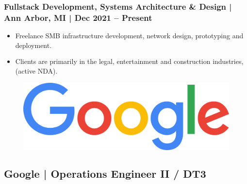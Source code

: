 \documentclass[letter,10pt]{article}
\begin{document}
\subsubsection*{Fullstack Development, Systems Architecture \& Design | Ann Arbor, MI | Dec 2021 – Present}
\label{sec:org9c40bfb}
\begin{itemize}
\item Freelance SMB infrastructure development, network design, prototyping and deployment.
\item Clients are primarily in the legal, entertainment and construction industries, (active NDA).
\end{itemize}




\begin{figure}
\includegraphics[width=0.85\linewidth]{./img/cr_google.jpg}
\end{figure}

\subsection*{Google | Operations Engineer II / DT3}
\label{sec:org6a29010}
\end{document}
